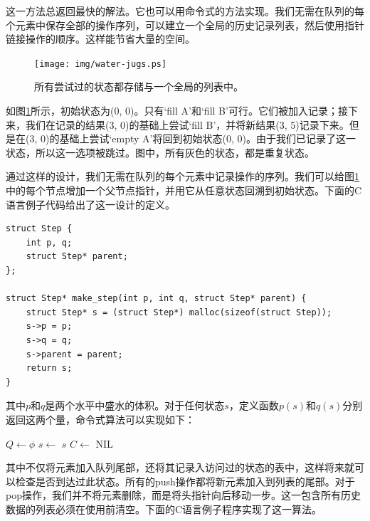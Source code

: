 \documentclass[UTF8]{article}
\begin{document}
这一方法总返回最快的解法。它也可以用命令式的方法实现。我们无需在队列的每个元素中保存全部的操作序列，可以建立一个全局的历史记录列表，然后使用指针链接操作的顺序。这样能节省大量的空间。

\begin{figure}[htbp]
  \centering
  \texttt{[image: img/water-jugs.ps]}
  \caption{所有尝试过的状态都存储与一个全局的列表中。}
  \label{fig:water-jugs}
\end{figure}

如图\ref{fig:water-jugs}所示，初始状态为(0, 0)。只有`fill A'和`fill B'可行。它们被加入记录；接下来，我们在记录的结果(3, 0)的基础上尝试`fill B'，并将新结果(3, 5)记录下来。但是在(3, 0)的基础上尝试`empty A'将回到初始状态(0, 0)。由于我们已记录了这一状态，所以这一选项被跳过。图中，所有灰色的状态，都是重复状态。

通过这样的设计，我们无需在队列的每个元素中记录操作的序列。我们可以给图\ref{fig:water-jugs}中的每个节点增加一个父节点指针，并用它从任意状态回溯到初始状态。下面的C语言例子代码给出了这一设计的定义。

\lstset{language=C}
\begin{lstlisting}
struct Step {
    int p, q;
    struct Step* parent;
};

struct Step* make_step(int p, int q, struct Step* parent) {
    struct Step* s = (struct Step*) malloc(sizeof(struct Step));
    s->p = p;
    s->q = q;
    s->parent = parent;
    return s;
}
\end{lstlisting}

其中$p$和$q$是两个水平中盛水的体积。对于任何状态$s$，定义函数$p(s)$和$q(s)$分别返回这两个量，命令式算法可以实现如下：

\begin{algorithmic}[1]
  \State $Q \gets \phi$
  \State {}
    \State $s \gets$ 
      \State \Return $s$
    \Else
      \State $C \gets$ 
          \State {}
        \EndIf
      \EndFor
    \EndIf
  \EndWhile
  \State \Return NIL
\EndFunction
\end{algorithmic}

其中不仅将元素加入队列尾部，还将其记录入访问过的状态的表中，这样将来就可以检查是否到达过此状态。所有的push操作都将新元素加入到列表的尾部。对于pop操作，我们并不将元素删除，而是将头指针向后移动一步。这一包含所有历史数据的列表必须在使用前清空。下面的C语言例子程序实现了这一算法。
\end{document}

